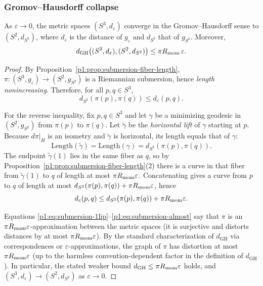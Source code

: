 \documentclass[11pt]{article}
\begin{document}
\subsubsection{Gromov--Hausdorff collapse}
\label{p1:subsec:berger-gh}

\begin{theorem}\label{p1:thm:berger-gh}
As $\varepsilon\to0$, the metric spaces $(S^3,d_\varepsilon)$ converge in the Gromov--Hausdorff sense to
$(S^2,d_{S^2})$, where $d_\varepsilon$ is the distance of $g_\varepsilon$ and $d_{S^2}$ that of $g_{S^2}$.
Moreover,
\[
d_{\mathrm{GH}}\big((S^3,d_\varepsilon),(S^2,d_{S^2})\big)\le \pi R_{\mathrm{mom}}\,\varepsilon.
\]
\end{theorem}

\begin{proof}
By Proposition~\ref{p1:prop:submersion-fiber-length}, $\pi:(S^3,g_\varepsilon)\to(S^2,g_{S^2})$ is a Riemannian
submersion, hence \emph{length nonincreasing}. Therefore, for all $p,q\in S^3$,
\begin{equation}\label{p1:eq:submersion-1lip}
d_{S^2}(\pi(p),\pi(q))\le d_\varepsilon(p,q).
\end{equation}

For the reverse inequality, fix $p,q\in S^3$ and let $\gamma$ be a minimizing geodesic in $(S^2,g_{S^2})$
from $\pi(p)$ to $\pi(q)$.
Let $\widetilde\gamma$ be the \emph{horizontal lift} of $\gamma$ starting at $p$.
Because $d\pi|_{H}$ is an isometry and $\widetilde\gamma$ is horizontal, its length equals that of $\gamma$:
\[
\mathrm{Length}(\widetilde\gamma)=\mathrm{Length}(\gamma)=d_{S^2}(\pi(p),\pi(q)).
\]
The endpoint $\widetilde\gamma(1)$ lies in the same fiber as $q$, so by
Proposition~\ref{p1:prop:submersion-fiber-length}(2) there is a curve in that fiber from $\widetilde\gamma(1)$ to $q$
of length at most $\pi R_{\mathrm{mom}} \varepsilon$.
Concatenating gives a curve from $p$ to $q$ of length at most
$d_{S^2}(\pi(p),\pi(q))+\pi R_{\mathrm{mom}} \varepsilon$, hence
\begin{equation}\label{p1:eq:submersion-almost}
d_\varepsilon(p,q)\le d_{S^2}(\pi(p),\pi(q))+\pi R_{\mathrm{mom}} \varepsilon.
\end{equation}

Equations \eqref{p1:eq:submersion-1lip}--\eqref{p1:eq:submersion-almost} say that $\pi$ is an $\pi R_{\mathrm{mom}} \varepsilon$-approximation
between the metric spaces (it is surjective and distorts distances by at most $\pi R_{\mathrm{mom}} \varepsilon$). By the standard
characterization of $d_{\mathrm{GH}}$ via correspondences or $\varepsilon$-approximations, the graph of $\pi$ has distortion at most $\pi R_{\mathrm{mom}}\varepsilon$ (up to the harmless convention-dependent factor in the definition of $d_{\mathrm{GH}}$). In particular, the stated weaker bound
$d_{\mathrm{GH}}\le \pi R_{\mathrm{mom}} \varepsilon$ holds, and $(S^3,d_\varepsilon)\to(S^2,d_{S^2})$ as $\varepsilon\to0$.
\end{proof}
\end{document}
